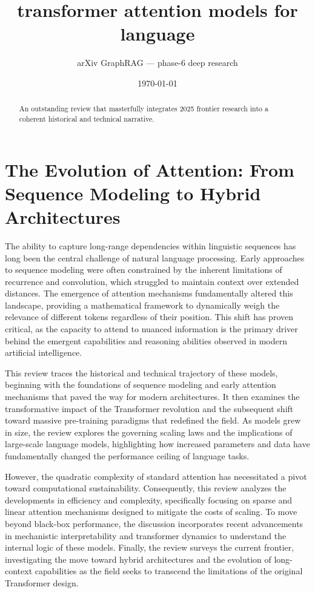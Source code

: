 \documentclass[11pt]{article}
\title{transformer attention models for language}
\author{arXiv GraphRAG --- phase-6 deep research}
\date{\today}
\begin{document}
\maketitle

\begin{abstract}
An outstanding review that masterfully integrates 2025 frontier research into a coherent historical and technical narrative.
\end{abstract}

\section{The Evolution of Attention: From Sequence Modeling to Hybrid Architectures}

The ability to capture long-range dependencies within linguistic sequences has long been the central challenge of natural language processing. Early approaches to sequence modeling were often constrained by the inherent limitations of recurrence and convolution, which struggled to maintain context over extended distances. The emergence of attention mechanisms fundamentally altered this landscape, providing a mathematical framework to dynamically weigh the relevance of different tokens regardless of their position. This shift has proven critical, as the capacity to attend to nuanced information is the primary driver behind the emergent capabilities and reasoning abilities observed in modern artificial intelligence.

This review traces the historical and technical trajectory of these models, beginning with the foundations of sequence modeling and early attention mechanisms that paved the way for modern architectures. It then examines the transformative impact of the Transformer revolution and the subsequent shift toward massive pre-training paradigms that redefined the field. As models grew in size, the review explores the governing scaling laws and the implications of large-scale language models, highlighting how increased parameters and data have fundamentally changed the performance ceiling of language tasks.

However, the quadratic complexity of standard attention has necessitated a pivot toward computational sustainability. Consequently, this review analyzes the developments in efficiency and complexity, specifically focusing on sparse and linear attention mechanisms designed to mitigate the costs of scaling. To move beyond black-box performance, the discussion incorporates recent advancements in mechanistic interpretability and transformer dynamics to understand the internal logic of these models. Finally, the review surveys the current frontier, investigating the move toward hybrid architectures and the evolution of long-context capabilities as the field seeks to transcend the limitations of the original Transformer design.
\end{document}
